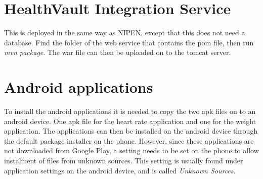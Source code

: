 \section{HealthVault Integration Service}

This is deployed in the same way as NIPEN, except that this does not need a database.
Find the folder of the web service that contains the pom file, then run \textit{mvn package}.
The war file can then be uploaded on to the tomcat server.

\section{Android applications}

To install the android applications it is needed to copy the two apk files on to an android device.
One apk file for the heart rate application and one for the weight application.
The applications can then be installed on the android device through the default package installer on the phone.
However, since these applications are not downloaded from Google Play, a setting needs to be set on the phone to allow instalment of files from unknown sources.
This setting is usually found under application settings on the android device, and is called \textit{Unknown Sources}.